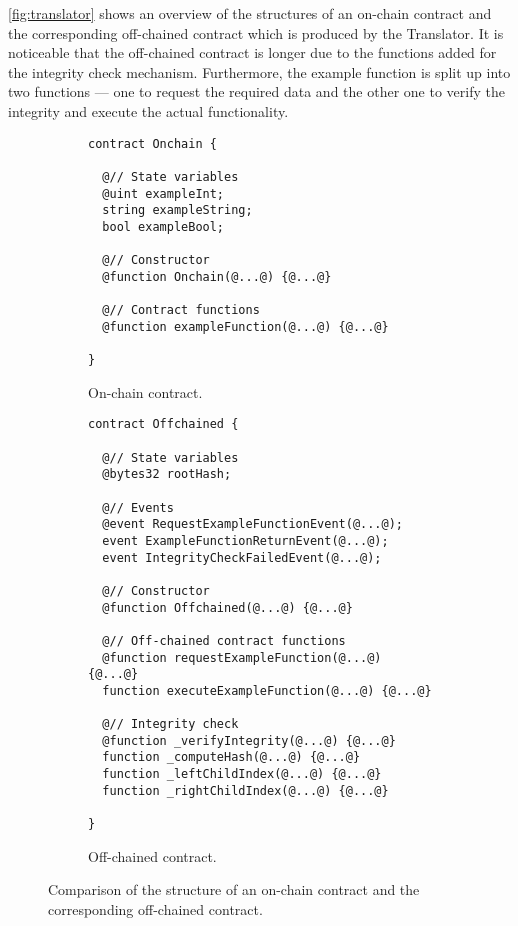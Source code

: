 		\autoref{fig:translator} shows an overview of the structures of an on-chain contract and the corresponding off-chained contract which is produced by the Translator. It is noticeable that the off-chained contract is longer due to the functions added for the integrity check mechanism. Furthermore, the example function is split up into two functions --- one to request the required data and the other one to verify the integrity and execute the actual functionality.

		\begin{figure}
				\centering
				\begin{subfigure}[b]{0.5\linewidth}
					\centering
\begin{lstlisting}[style=base]
contract Onchain {

  @// State variables
  @uint exampleInt;
  string exampleString;
  bool exampleBool;

  @// Constructor
  @function Onchain(@...@) {@...@}

  @// Contract functions
  @function exampleFunction(@...@) {@...@}

}
\end{lstlisting}
					\caption{On-chain contract.}
				\end{subfigure}%
				\begin{subfigure}[b]{0.5\linewidth}
					\centering
\begin{lstlisting}[style=base]
contract Offchained {

  @// State variables
  @bytes32 rootHash;

  @// Events
  @event RequestExampleFunctionEvent(@...@);
  event ExampleFunctionReturnEvent(@...@);
  event IntegrityCheckFailedEvent(@...@);

  @// Constructor
  @function Offchained(@...@) {@...@}

  @// Off-chained contract functions
  @function requestExampleFunction(@...@) {@...@}
  function executeExampleFunction(@...@) {@...@}

  @// Integrity check
  @function _verifyIntegrity(@...@) {@...@}
  function _computeHash(@...@) {@...@}
  function _leftChildIndex(@...@) {@...@}
  function _rightChildIndex(@...@) {@...@}

}
\end{lstlisting}
					\caption{Off-chained contract.}
					\label{}
				\end{subfigure}
				\caption{Comparison of the structure of an on-chain contract and the corresponding off-chained contract.}
				\label{fig:translator}
			\end{figure}
